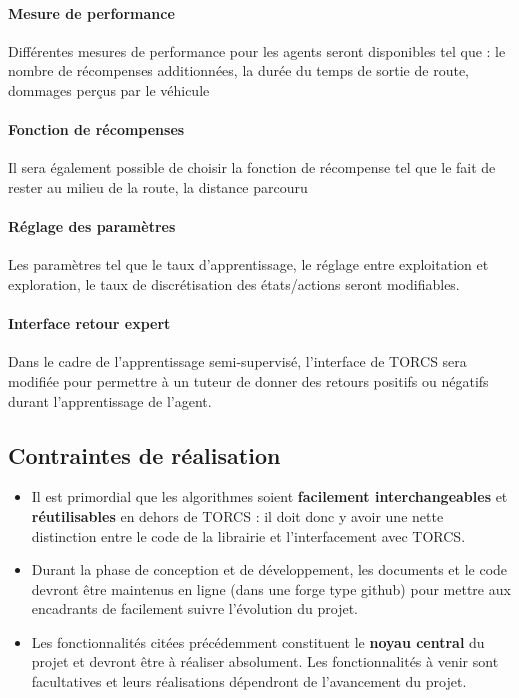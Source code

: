 \documentclass[a4paper,12pt]{article}
\begin{document}
		\paragraph{Mesure de performance} Différentes mesures de performance pour les agents seront disponibles
		tel que : le nombre de récompenses additionnées, la durée du temps de sortie de route, dommages perçus par  
                le véhicule 
		\paragraph{Fonction de récompenses} Il sera également possible de choisir la fonction de récompense 
		tel que le fait de rester au milieu de la route, la distance parcouru
		\paragraph{Réglage des paramètres} Les paramètres tel que le taux d'apprentissage, le réglage entre
		exploitation et exploration, le taux de discrétisation des états/actions seront modifiables.
		\paragraph{Interface retour expert} Dans le cadre de l'apprentissage semi-supervisé, l'interface de TORCS
		sera modifiée pour permettre à un tuteur de donner des retours positifs ou négatifs durant l'apprentissage
		de l'agent.
	\subsection{Contraintes de réalisation}
	  \begin{itemize}
	   \item Il est primordial que les algorithmes soient \textbf{facilement interchangeables} et \textbf{réutilisables}
	   en dehors de TORCS : il doit donc y avoir une nette distinction entre le code de la librairie et
	   l'interfacement avec TORCS.
	   \item Durant la phase de conception et de développement, les documents et le code devront être maintenus 
	   en ligne (dans une forge type github) pour mettre aux encadrants de facilement suivre l'évolution du projet.
	   \item Les fonctionnalités citées précédemment constituent le \textbf{noyau central} du projet et devront être à
	   réaliser absolument. Les fonctionnalités à venir sont facultatives et leurs réalisations dépendront de 
	   l'avancement du projet.
	  \end{itemize}
		
\end{document}
